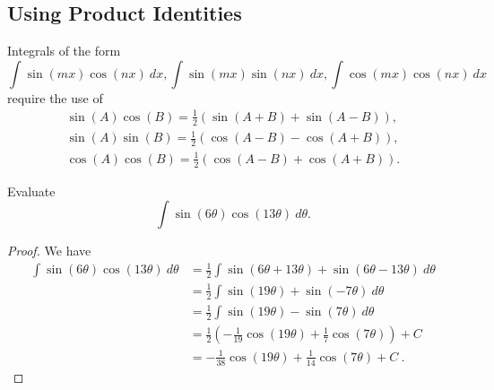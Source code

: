 \documentclass[compacto,10pt,comentarios]{aleph-notas}
\begin{document}
\subsection*{Using Product Identities}
Integrals of the form
$$
    \int \sin(mx) \cos(nx) ~ dx, \int \sin(mx) \sin(nx) ~ dx, \int \cos(mx)\cos(nx) ~dx
$$
require the use of
\begin{align*}
    \sin(A)\cos(B) = \frac{1}{2} \left( \sin(A + B) + \sin(A - B) \right), \\
    \sin(A)\sin(B) = \frac{1}{2} \left( \cos(A - B) - \cos(A + B) \right), \\ 
    \cos(A)\cos(B) = \frac{1}{2} \left( \cos(A - B) + \cos(A +B)\right).
\end{align*}

\begin{ejer}
    Evaluate
    $$
        \int \sin(6\theta) \cos(13\theta)~ d\theta.
    $$
\end{ejer}
\begin{proof}
    We have
    \begin{align*}
        \int \sin(6\theta) \cos(13\theta)~ d\theta
        & = \frac{1}{2} \int \sin\left( 6\theta + 13\theta \right) + \sin\left( 6\theta - 13\theta \right) ~ d\theta \\
        & = \frac{1}{2} \int \sin\left( 19\theta \right)  + \sin\left( -7 \theta \right)  ~ d\theta \\
        & = \frac{1}{2} \int \sin\left( 19\theta \right)  - \sin\left(7 \theta \right)  ~ d\theta \tag*{since $\sin(x)$ is odd} \\
        & = \frac{1}{2} \left( -\frac{1}{19} \cos(19\theta) + \frac{1}{7} \cos\left(7 \theta \right) \right)  + C  \\
        & = -\frac{1}{38} \cos(19\theta) + \frac{1}{14} \cos\left(7 \theta \right)  + C ~ .
    \end{align*}
\end{proof}
\end{document}
